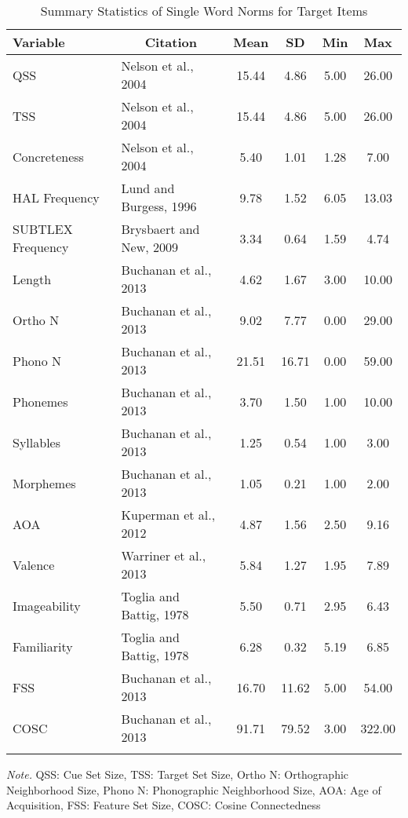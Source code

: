 \documentclass[english,man]{apa6}
\theoremstyle{definition}
\theoremstyle{definition}
\theoremstyle{definition}
\theoremstyle{remark}
\begin{document}
\begin{table}[tbp]
\begin{center}
\begin{threeparttable}
\caption{\label{tab:stim-table-target}Summary Statistics of Single Word Norms for Target Items}
\begin{tabular}{llcccc}
\toprule
Variable & \multicolumn{1}{c}{Citation} & \multicolumn{1}{c}{Mean} & \multicolumn{1}{c}{SD} & \multicolumn{1}{c}{Min} & \multicolumn{1}{c}{Max}\\
\midrule
QSS & Nelson et al., 2004 & 15.44 & 4.86 & 5.00 & 26.00\\
TSS & Nelson et al., 2004 & 15.44 & 4.86 & 5.00 & 26.00\\
Concreteness & Nelson et al., 2004 & 5.40 & 1.01 & 1.28 & 7.00\\
HAL Frequency & Lund and Burgess, 1996 & 9.78 & 1.52 & 6.05 & 13.03\\
SUBTLEX Frequency & Brysbaert and New, 2009 & 3.34 & 0.64 & 1.59 & 4.74\\
Length & Buchanan et al., 2013 & 4.62 & 1.67 & 3.00 & 10.00\\
Ortho N & Buchanan et al., 2013 & 9.02 & 7.77 & 0.00 & 29.00\\
Phono N & Buchanan et al., 2013 & 21.51 & 16.71 & 0.00 & 59.00\\
Phonemes & Buchanan et al., 2013 & 3.70 & 1.50 & 1.00 & 10.00\\
Syllables & Buchanan et al., 2013 & 1.25 & 0.54 & 1.00 & 3.00\\
Morphemes & Buchanan et al., 2013 & 1.05 & 0.21 & 1.00 & 2.00\\
AOA & Kuperman et al., 2012 & 4.87 & 1.56 & 2.50 & 9.16\\
Valence & Warriner et al., 2013 & 5.84 & 1.27 & 1.95 & 7.89\\
Imageability & Toglia and Battig, 1978 & 5.50 & 0.71 & 2.95 & 6.43\\
Familiarity & Toglia and Battig, 1978 & 6.28 & 0.32 & 5.19 & 6.85\\
FSS & Buchanan et al., 2013 & 16.70 & 11.62 & 5.00 & 54.00\\
COSC & Buchanan et al., 2013 & 91.71 & 79.52 & 3.00 & 322.00\\
\bottomrule
\addlinespace
\end{tabular}
\begin{tablenotes}[para]
\textit{Note.} QSS: Cue Set Size, TSS: Target Set Size, Ortho N: Orthographic Neighborhood Size, Phono N: Phonographic Neighborhood Size, AOA: Age of Acquisition, FSS: Feature Set Size, COSC: Cosine Connectedness
\end{tablenotes}
\end{threeparttable}
\end{center}
\end{table}
\end{document}
